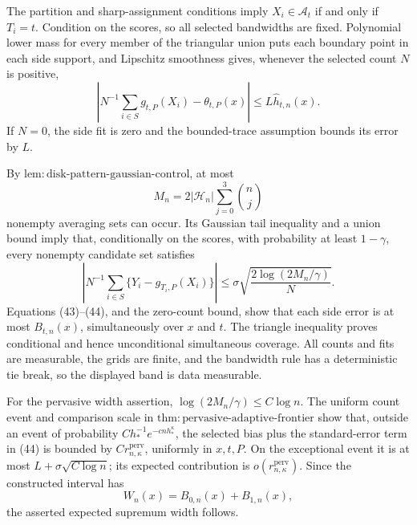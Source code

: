 The partition and sharp-assignment conditions imply \(X_i\in\mathcal A_t\) if and only if \(T_i=t\).  Condition on the scores, so all selected bandwidths are fixed.  Polynomial lower mass for every member of the triangular union puts each boundary point in each side support, and Lipschitz smoothness gives, whenever the selected count \(N\) is positive,
\[
 \left|N^{-1}\sum_{i\in S}g_{t,P}(X_i)-\theta_{t,P}(x)\right|
 \le L\widehat h_{t,n}(x). \tag{43}
\]
If \(N=0\), the side fit is zero and the bounded-trace assumption bounds its error by \(L\).

By \(\mathrm{lem:disk\text{-}pattern\text{-}gaussian\text{-}control}\), at most
\[
 M_n=2|\mathcal H_n|\sum_{j=0}^3\binom nj
\]
nonempty averaging sets can occur.  Its Gaussian tail inequality and a union bound imply that, conditionally on the scores, with probability at least \(1-\gamma\), every nonempty candidate set satisfies
\[
 \left|N^{-1}\sum_{i\in S}\{Y_i-g_{T_i,P}(X_i)\}\right|
 \le\sigma\sqrt{\frac{2\log(2M_n/\gamma)}N}. \tag{44}
\]
Equations (43)--(44), and the zero-count bound, show that each side error is at most \(B_{t,n}(x)\), simultaneously over \(x\) and \(t\).  The triangle inequality proves conditional and hence unconditional simultaneous coverage.  All counts and fits are measurable, the grids are finite, and the bandwidth rule has a deterministic tie break, so the displayed band is data measurable.

For the pervasive width assertion, \(\log(2M_n/\gamma)\le C\log n\).  The uniform count event and comparison scale in \(\mathrm{thm:pervasive\text{-}adaptive\text{-}frontier}\) show that, outside an event of probability \(Ch_*^{-1}e^{-cnh_*^{\kappa}}\), the selected bias plus the standard-error term in (44) is bounded by \(Cr_{n,\kappa}^{\mathrm{perv}}\), uniformly in \(x,t,P\).  On the exceptional event it is at most \(L+\sigma\sqrt{C\log n}\); its expected contribution is \(o(r_{n,\kappa}^{\mathrm{perv}})\).  Since the constructed interval has
\[
 W_n(x)=B_{0,n}(x)+B_{1,n}(x),
\]
the asserted expected supremum width follows.

